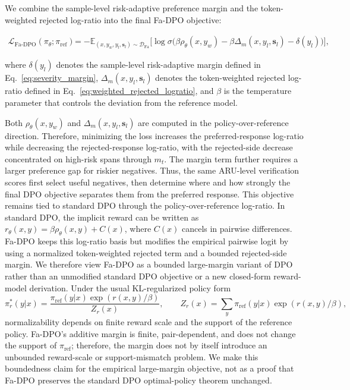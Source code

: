 \documentclass[a4paper,fleqn,doubleblind]{cas-sc}
\begin{document}
We combine the sample-level risk-adaptive preference margin and the token-weighted rejected log-ratio into the final Fa-DPO objective:

\begin{equation}
\label{eq:fa_dpo}
\begin{split}
\mathcal{L}_{\text{Fa-DPO}}(\pi_\theta; \pi_{\text{ref}})
&= -\mathbb{E}_{(x, y_w, y_l, \mathbf{s}_l) \sim \mathcal{D}_{\text{Fa}}} \Bigg[
\log \sigma \Bigg(
\beta \rho_\theta(x,y_w)
- \beta \Delta_m(x,y_l,\mathbf{s}_l)
- \delta(y_l)
\Bigg) \Bigg],
\end{split}
\end{equation}

where $\delta(y_l)$ denotes the sample-level risk-adaptive margin defined in Eq.~\ref{eq:severity_margin},
$\Delta_m(x,y_l,\mathbf{s}_l)$ denotes the token-weighted rejected log-ratio defined in Eq.~\ref{eq:weighted_rejected_logratio},
and $\beta$ is the temperature parameter that controls the deviation from the reference model.

Both $\rho_\theta(x,y_w)$ and $\Delta_m(x,y_l,\mathbf{s}_l)$ are computed in the policy-over-reference direction. Therefore, minimizing the loss increases the preferred-response log-ratio while decreasing the rejected-response log-ratio, with the rejected-side decrease concentrated on high-risk spans through $m_t$. The margin term further requires a larger preference gap for riskier negatives. Thus, the same ARU-level verification scores first select useful negatives, then determine where and how strongly the final DPO objective separates them from the preferred response.
This objective remains tied to standard DPO through the policy-over-reference log-ratio. In standard DPO, the implicit reward can be written as $r_\theta(x,y)=\beta\rho_\theta(x,y)+C(x)$, where $C(x)$ cancels in pairwise differences. Fa-DPO keeps this log-ratio basis but modifies the empirical pairwise logit by using a normalized token-weighted rejected term and a bounded rejected-side margin. We therefore view Fa-DPO as a bounded large-margin variant of DPO rather than an unmodified standard DPO objective or a new closed-form reward-model derivation. Under the usual KL-regularized policy form
\[
\pi_r^*(y|x)=
\frac{\pi_{\mathrm{ref}}(y|x)\exp(r(x,y)/\beta)}
{Z_r(x)},
\qquad
Z_r(x)=\sum_y \pi_{\mathrm{ref}}(y|x)\exp(r(x,y)/\beta),
\]
normalizability depends on finite reward scale and the support of the reference policy. Fa-DPO's additive margin is finite, pair-dependent, and does not change the support of $\pi_{\mathrm{ref}}$; therefore, the margin does not by itself introduce an unbounded reward-scale or support-mismatch problem. We make this boundedness claim for the empirical large-margin objective, not as a proof that Fa-DPO preserves the standard DPO optimal-policy theorem unchanged.
\end{document}

